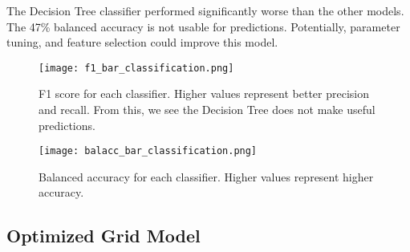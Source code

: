 \par
The Decision Tree classifier performed significantly worse than the other models.
The 47\% balanced accuracy is not usable for predictions.
Potentially, parameter tuning, and feature selection could improve this model.


\begin{figure}[htp]
    \centering
    \texttt{[image: f1\_bar\_classification.png]}
    \caption{F1 score for each classifier. Higher values represent better precision and recall. From this, we see the Decision Tree does not make useful predictions.}
    \label{fig:f1_barplot_classification}
\end{figure}

\begin{figure}[htp]
    \centering
    \texttt{[image: balacc\_bar\_classification.png]}
    \caption{Balanced accuracy for each classifier. Higher values represent higher accuracy.}
    \label{fig:balacc_barplot_classification}
\end{figure}

\subsection{Optimized Grid Model}
\setlength{\parindent}{10ex}

